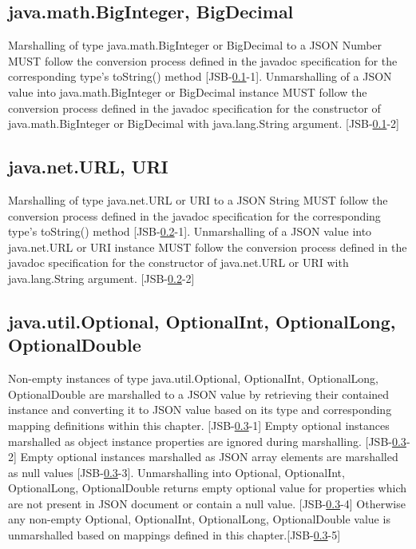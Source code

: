 \subsection{java.math.BigInteger, BigDecimal}
\label{subsec:bignumber}
Marshalling of type java.math.BigInteger or BigDecimal to a JSON Number 
MUST follow the conversion process defined in the javadoc specification for the corresponding type's toString() method [JSB-\ref{subsec:bignumber}-1]. 
Unmarshalling of a JSON value into java.math.BigInteger or BigDecimal instance 
MUST follow the conversion process defined in the javadoc specification for the constructor of java.math.BigInteger or BigDecimal with java.lang.String argument. [JSB-\ref{subsec:bignumber}-2]

\subsection{java.net.URL, URI}
\label{subsec:url}
Marshalling of type java.net.URL or URI to a JSON String 
MUST follow the conversion process defined in the javadoc specification for the corresponding type's toString() method [JSB-\ref{subsec:url}-1]. 
Unmarshalling of a JSON value into java.net.URL or URI instance 
MUST follow the conversion process defined in the javadoc specification for the constructor of java.net.URL or URI with java.lang.String argument. [JSB-\ref{subsec:url}-2]

\subsection{java.util.Optional, OptionalInt, OptionalLong, OptionalDouble}
\label{subsec:optional}
Non-empty instances of type java.util.Optional, OptionalInt, OptionalLong, OptionalDouble are marshalled to a JSON value by retrieving their contained instance and 
converting it to JSON value based on its type and corresponding mapping definitions within this chapter. [JSB-\ref{subsec:optional}-1] 
Empty optional instances marshalled as object instance properties are ignored during marshalling. [JSB-\ref{subsec:optional}-2] 
Empty optional instances marshalled as JSON array elements are marshalled as null values [JSB-\ref{subsec:optional}-3]. 
Unmarshalling into Optional, OptionalInt, OptionalLong, OptionalDouble returns empty optional value for properties which are not present in JSON document or contain a null value. [JSB-\ref{subsec:optional}-4] 
Otherwise any non-empty Optional, OptionalInt, OptionalLong, OptionalDouble value is unmarshalled based on mappings defined in this chapter.[JSB-\ref{subsec:optional}-5]

